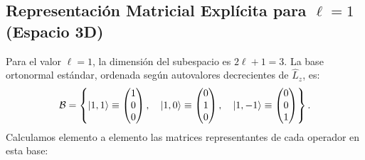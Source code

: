

\subsection{Representación Matricial Explícita para \texorpdfstring{$\ell = 1$}{l = 1} (Espacio 3D)}
\label{subsec:matrices_l1}

Para el valor $\ell = 1$, la dimensión del subespacio es $2\ell + 1 = 3$. La base ortonormal estándar, ordenada según autovalores decrecientes de $\hat{L}_z$, es:
\begin{equation}
    \mathcal{B} = \left\{ \left| 1, 1 \right\rangle \equiv \begin{pmatrix} 1 \\ 0 \\ 0 \end{pmatrix}, \quad \left| 1, 0 \right\rangle \equiv \begin{pmatrix} 0 \\ 1 \\ 0 \end{pmatrix}, \quad \left| 1, -1 \right\rangle \equiv \begin{pmatrix} 0 \\ 0 \\ 1 \end{pmatrix} \right\}.
\end{equation}
Calculamos elemento a elemento las matrices representantes de cada operador en esta base:
